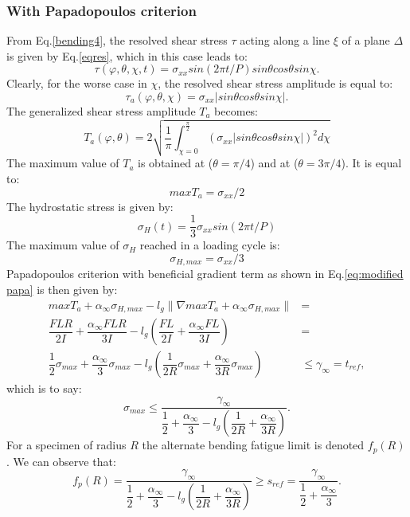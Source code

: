 \subsubsection{With Papadopoulos criterion}  
From Eq.\ref{bending4}, the resolved shear stress $\tau$ acting along a line $\xi$ of a plane $\Delta$ is given by Eq.\ref{eqres}, which in this case leads to:
\begin{equation}
	\tau(\varphi,\theta,\chi,t)=\sigma_{xx}sin(2\pi t/P)sin\theta cos\theta sin\chi.
\end{equation}
Clearly, for the worse case in $\chi$,  the resolved shear stress amplitude is equal to:
\begin{equation}
	\tau_a(\varphi,\theta,\chi)=\sigma_{xx}|sin\theta cos\theta sin\chi|.
\end{equation}
The generalized shear stress amplitude $T_a$ becomes:
\begin{equation}
	T_a(\varphi,\theta)=2\sqrt{\dfrac{1}{\pi}\int_{\chi=0}^{\frac{\pi}{2}}(\sigma_{xx}|sin\theta cos\theta sin\chi|)^2d\chi}
\end{equation}
The maximum value of $T_a$ is obtained at ($\theta=\pi/4$) and at ($\theta=3\pi/4$). It is equal to:
\begin{equation}
	maxT_a=\sigma_{xx}/2
\end{equation}
The hydrostatic stress is given by:
\begin{equation}
	\sigma_{H}(t)=\dfrac{1}{3}\sigma_{xx}sin(2\pi t/P)
\end{equation}
The maximum value of $\sigma_H$ reached in a loading cycle is:
\begin{equation}
	\sigma_{H,max}=\sigma_{xx}/3
\end{equation}
Papadopoulos criterion with beneficial gradient term as shown in Eq.\eqref{eq:modified papa} is then given by:
\begin{equation}
	\begin{split}
		maxT_a+\alpha_\infty\sigma_{H,max}-l_g\parallel\nabla{maxT_a}+\alpha_\infty\sigma_{H,max}\parallel&=\\\dfrac{FLR}{2I} +\dfrac{\alpha_\infty FLR}{3I}-l_g\left( \dfrac{FL}{2I}+\dfrac{\alpha_\infty FL}{3I}\right) &=\\ \dfrac{1}{2}\sigma_{max}+\dfrac{\alpha_\infty}{3}\sigma_{max}-l_g\left( \dfrac{1}{2R}\sigma_{max}+\dfrac{\alpha_\infty}{3R}\sigma_{max}\right) &\leqslant \gamma_\infty = t_{ref} ,
	\end{split}
\end{equation}
which is to say:
\begin{equation}
	\sigma_{max}\leqslant\dfrac{\gamma_\infty}{\dfrac{1}{2}+\dfrac{\alpha_\infty}{3}-l_g(\dfrac{1}{2R}+\dfrac{\alpha_\infty}{3R})} .
\end{equation}
For a specimen of radius $R$
the alternate bending fatigue limit is denoted $f_p(R)$.
We can observe that:
\begin{equation}
	f_p(R)=\dfrac{\gamma_\infty}{\dfrac{1}{2}+\dfrac{\alpha_\infty}{3}-l_g\left( \dfrac{1}{2R}+\dfrac{\alpha_\infty}{3R}\right) }\geqslant s_{ref} = \dfrac{\gamma_\infty}{\dfrac{1}{2}+\dfrac{\alpha_\infty}{3}}.
	\label{papa-fr}
\end{equation}

